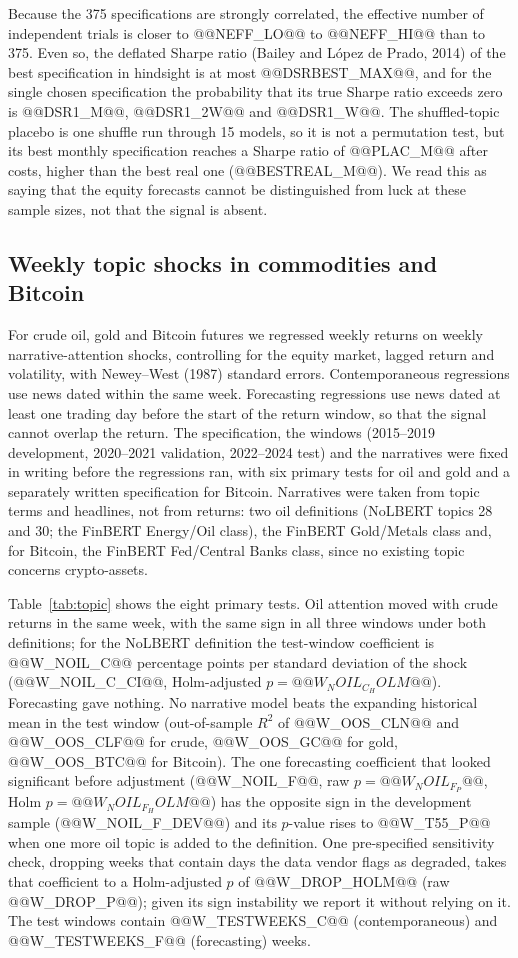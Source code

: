 \documentclass[11pt]{article}
\begin{document}
Because the 375 specifications are strongly correlated, the effective number of independent trials is closer to @@NEFF_LO@@ to @@NEFF_HI@@ than to 375. Even so, the deflated Sharpe ratio (Bailey and L\'opez de Prado, 2014) of the best specification in hindsight is at most @@DSRBEST_MAX@@, and for the single chosen specification the probability that its true Sharpe ratio exceeds zero is @@DSR1_M@@, @@DSR1_2W@@ and @@DSR1_W@@. The shuffled-topic placebo is one shuffle run through 15 models, so it is not a permutation test, but its best monthly specification reaches a Sharpe ratio of @@PLAC_M@@ after costs, higher than the best real one (@@BESTREAL_M@@). We read this as saying that the equity forecasts cannot be distinguished from luck at these sample sizes, not that the signal is absent.

\subsection{Weekly topic shocks in commodities and Bitcoin}

For crude oil, gold and Bitcoin futures we regressed weekly returns on weekly narrative-attention shocks, controlling for the equity market, lagged return and volatility, with Newey--West (1987) standard errors. Contemporaneous regressions use news dated within the same week. Forecasting regressions use news dated at least one trading day before the start of the return window, so that the signal cannot overlap the return. The specification, the windows (2015--2019 development, 2020--2021 validation, 2022--2024 test) and the narratives were fixed in writing before the regressions ran, with six primary tests for oil and gold and a separately written specification for Bitcoin. Narratives were taken from topic terms and headlines, not from returns: two oil definitions (NoLBERT topics 28 and 30; the FinBERT Energy/Oil class), the FinBERT Gold/Metals class and, for Bitcoin, the FinBERT Fed/Central Banks class, since no existing topic concerns crypto-assets.

Table~\ref{tab:topic} shows the eight primary tests. Oil attention moved with crude returns in the same week, with the same sign in all three windows under both definitions; for the NoLBERT definition the test-window coefficient is @@W_NOIL_C@@ percentage points per standard deviation of the shock (@@W_NOIL_C_CI@@, Holm-adjusted $p=@@W_NOIL_C_HOLM@@$). Forecasting gave nothing. No narrative model beats the expanding historical mean in the test window (out-of-sample $R^2$ of @@W_OOS_CLN@@ and @@W_OOS_CLF@@ for crude, @@W_OOS_GC@@ for gold, @@W_OOS_BTC@@ for Bitcoin). The one forecasting coefficient that looked significant before adjustment (@@W_NOIL_F@@, raw $p=@@W_NOIL_F_P@@$, Holm $p=@@W_NOIL_F_HOLM@@$) has the opposite sign in the development sample (@@W_NOIL_F_DEV@@) and its $p$-value rises to @@W_T55_P@@ when one more oil topic is added to the definition. One pre-specified sensitivity check, dropping weeks that contain days the data vendor flags as degraded, takes that coefficient to a Holm-adjusted $p$ of @@W_DROP_HOLM@@ (raw @@W_DROP_P@@); given its sign instability we report it without relying on it. The test windows contain @@W_TESTWEEKS_C@@ (contemporaneous) and @@W_TESTWEEKS_F@@ (forecasting) weeks.
\end{document}
